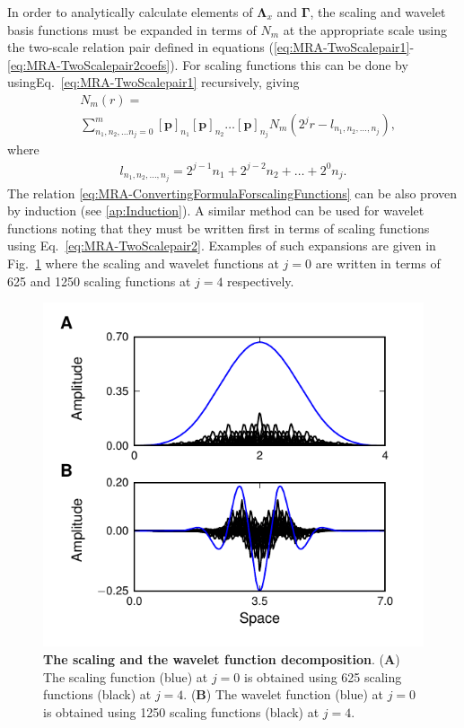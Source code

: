 \documentclass[review,authoryear,3p]{elsarticle}
\begin{document}
In order to analytically calculate elements of $\boldsymbol\Lambda_{x}$ and $\boldsymbol\Gamma$, the scaling and wavelet basis functions must be expanded in terms of $N_m$ at the appropriate scale using the two-scale relation pair defined in equations (\ref{eq:MRA-TwoScalepair1}-\ref{eq:MRA-TwoScalepair2coefs}). For scaling functions this can be done  by usingEq.~\eqref{eq:MRA-TwoScalepair1} recursively, giving
\begin{align}\label{eq:MRA-ConvertingFormulaForscalingFunctions}
 &N_m(r)=\nonumber \\
&\sum_{n_1,n_2, \dots n_j=0}^{m}\left[\mathbf p\right]_{n_1} \left[\mathbf p\right]_{n_2}\dots \left[\mathbf p\right]_{n_j}N_m(2^jr-l_{n_1,n_2, \dots, n_j}),
\end{align}
where 
\begin{align}
 l_{n_1,n_2, \dots, n_j}=2^{j-1}n_1+2^{j-2}n_2+ \dots +2^{0}n_j.
\end{align}
The relation \eqref{eq:MRA-ConvertingFormulaForscalingFunctions} can be also proven by induction (see \ref{ap:Induction}). A similar method can be used for wavelet functions noting that they must be written first in terms of scaling functions using Eq.~\eqref{eq:MRA-TwoScalepair2}. Examples of such expansions are given in Fig.~\ref{fig:MRA-BasisDecomposition} where the scaling and wavelet functions at $j=0$ are written in terms of 625 and 1250 scaling functions at $j=4$ respectively.
\begin{figure}[!t] 
 	\centering
 		\includegraphics[scale=1]{./Graph/fig5.pdf}
 		\caption{{\bf The scaling and the wavelet function decomposition}. (\textbf{A}) The scaling function (blue) at $j=0$ is obtained using 625 scaling functions (black) at $j=4$. (\textbf{B}) The wavelet function (blue) at $j=0$ is obtained using 1250 scaling functions (black) at $j=4$.}
 	\label{fig:MRA-BasisDecomposition}
 \end{figure}  
\end{document}
